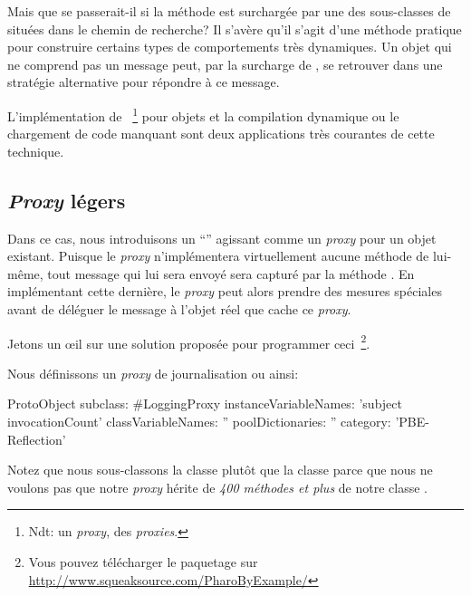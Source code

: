 \documentclass[a4paper,10pt,twoside]{book}
\begin{document}
Mais que se passerait-il si la méthode  est surchargée 
par une des sous-classes de  situées dans le chemin de recherche? %
Il s'avère qu'il s'agit d'une méthode pratique pour construire certains types de comportements très dynamiques. Un objet qui ne comprend pas un message peut, par la surcharge de , se retrouver dans une stratégie alternative pour répondre à ce message.

L'implémentation de ~\footnote{Ndt: un \emph{proxy}, des \emph{proxies}.} pour objets et la compilation dynamique ou le chargement de code manquant sont deux applications très courantes de cette technique.

\subsection{\emph{Proxy} légers}

Dans ce cas, nous introduisons un ``''
agissant comme un \emph{proxy} pour un objet existant.
Puisque le \emph{proxy} n'implémentera virtuellement aucune méthode de lui-même, tout message qui lui sera envoyé sera capturé par la méthode
 . En implémentant cette dernière, le \emph{proxy} peut alors prendre des mesures spéciales avant de déléguer le message à l'objet réel que cache ce \emph{proxy}.

Jetons un \oe il sur une solution proposée pour programmer ceci~\footnote{Vous pouvez télécharger le paquetage  sur \url{http://www.squeaksource.com/PharoByExample/}}.

Nous définissons un \emph{proxy} de journalisation ou  ainsi:

\begin{code}{}
ProtoObject subclass: #LoggingProxy
	instanceVariableNames: 'subject invocationCount'
	classVariableNames: ''
	poolDictionaries: ''
	category: 'PBE-Reflection'
\end{code}
Notez que nous sous-classons la classe  plutôt que la classe
 parce que nous ne voulons pas que notre \emph{proxy} hérite de \emph{400 méthodes et plus} de notre classe .
\end{document}
